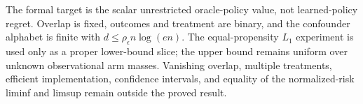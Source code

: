 The formal target is the scalar unrestricted oracle-policy value, not learned-policy regret.  Overlap is fixed, outcomes and treatment are binary, and the confounder alphabet is finite with \(d\le\rho_\epsilon n\log(en)\).  The equal-propensity \(L_1\) experiment is used only as a proper lower-bound slice; the upper bound remains uniform over unknown observational arm masses.  Vanishing overlap, multiple treatments, efficient implementation, confidence intervals, and equality of the normalized-risk liminf and limsup remain outside the proved result.